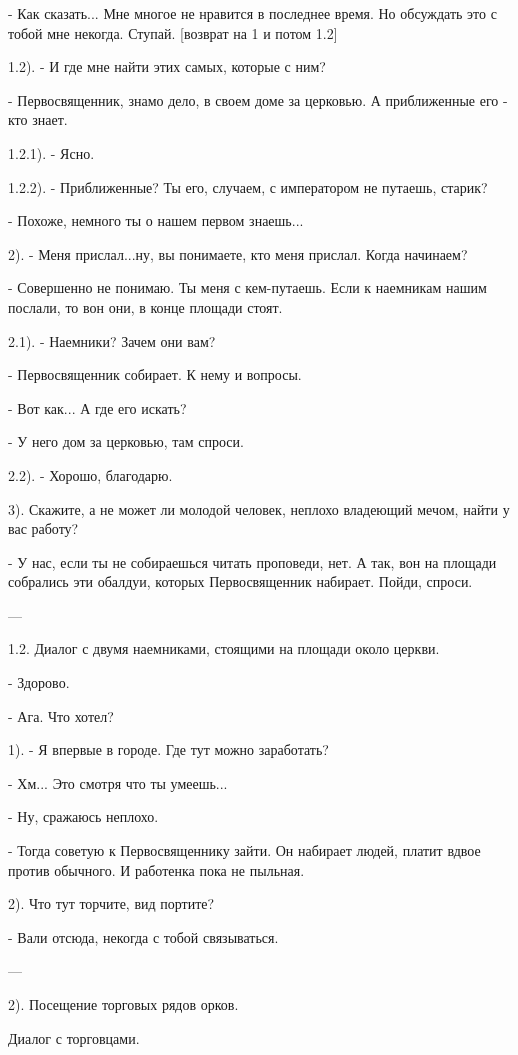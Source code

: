 \documentclass[12pt,a4paper]{book}
\begin{document}
- Как сказать... Мне многое не нравится в последнее время. Но обсуждать это с тобой мне некогда. Ступай. [возврат на 1 и потом 1.2]

1.2). - И где мне найти этих самых, которые с ним?

- Первосвященник, знамо дело, в своем доме за церковью. А приближенные его - кто знает.

1.2.1). - Ясно.

1.2.2). - Приближенные? Ты его, случаем, с императором не путаешь, старик?

- Похоже, немного ты о нашем первом знаешь... 

2). - Меня прислал...ну, вы понимаете, кто меня прислал. Когда начинаем?

- Совершенно не понимаю. Ты меня с кем-путаешь. Если к наемникам нашим послали, то вон они, в конце площади стоят.

2.1). - Наемники? Зачем они вам?

- Первосвященник собирает. К нему и вопросы.

- Вот как... А где его искать?

- У него дом за церковью, там спроси.

2.2). - Хорошо, благодарю.

3). Скажите, а не может ли молодой человек, неплохо владеющий мечом, найти у вас работу?

- У нас, если ты не собираешься читать проповеди, нет. А так, вон на площади собрались эти обалдуи, которых Первосвященник набирает. Пойди, спроси. 

---

1.2. Диалог с двумя наемниками, стоящими на площади около церкви.

- Здорово.

- Ага. Что хотел?

1). - Я впервые в городе. Где тут можно заработать?

- Хм... Это смотря что ты умеешь...

- Ну, сражаюсь неплохо.

- Тогда советую к Первосвященнику зайти. Он набирает людей, платит вдвое против обычного. И работенка пока не пыльная.

2). Что тут торчите, вид портите?

- Вали отсюда, некогда с тобой связываться.

---

2). Посещение торговых рядов орков.

Диалог с торговцами.
\end{document}
